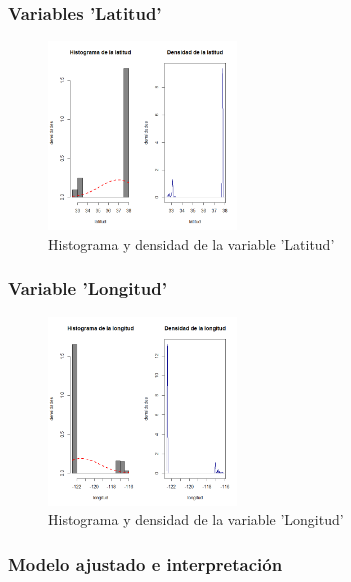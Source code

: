 \documentclass[12pt]{beamer}
\begin{document}
\begin{frame}
\frametitle{Variables 'Latitud'}
\begin{figure}[!h]
    \begin{center}
        \includegraphics[width=5cm]{imagenes/8.png}
        \caption{Histograma y densidad de la variable 'Latitud'}
        \label{fig:Densidad}
    \end{center}
\end{figure}
\end{frame}

\begin{frame}
\frametitle{Variable 'Longitud'}
\begin{figure}[!h]
    \begin{center}
        \includegraphics[width=5cm]{imagenes/9.png}
        \caption{Histograma y densidad de la variable 'Longitud'}
        \label{fig:Densidad}
    \end{center}
\end{figure}
\end{frame}
\begin{frame}
\frametitle{Modelo ajustado e interpretación}
\end{frame}
\end{document}
